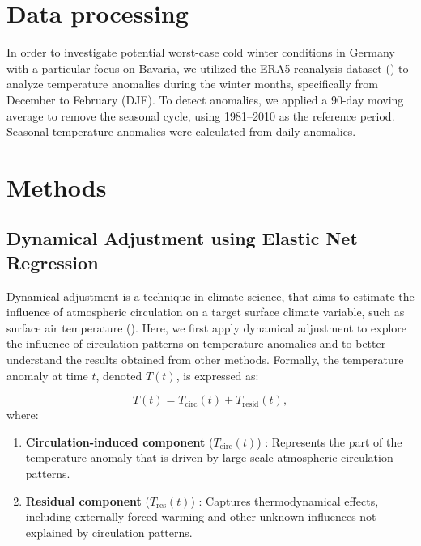 \documentclass[
]{krantz}
\begin{document}
\section{Data processing}\label{data-processing}

In order to investigate potential worst-case cold winter conditions in Germany with a particular focus on Bavaria, we utilized the ERA5 reanalysis dataset (\citet{hersbach2020}) to analyze temperature anomalies during the winter months, specifically from December to February (DJF). To detect anomalies, we applied a 90-day moving average to remove the seasonal cycle, using 1981--2010 as the reference period. Seasonal temperature anomalies were calculated from daily anomalies.

\section{Methods}\label{methods}

\subsection{Dynamical Adjustment using Elastic Net Regression}\label{dynamical-adjustment-using-elastic-net-regression}

Dynamical adjustment is a technique in climate science, that aims to estimate the influence of atmospheric circulation on a target surface climate variable, such as surface air temperature (\citep{wallace1995, smoliak2015, deser2016}). Here, we first apply dynamical adjustment to explore the influence of circulation patterns on temperature anomalies and to better understand the results obtained from other methods. Formally, the temperature anomaly at time \(t\), denoted \(T(t)\), is expressed as:

\[
T(t) = T_{\text{circ}}(t) + T_{\text{resid}}(t),
\]
where:

\begin{enumerate}
\def\labelenumi{\arabic{enumi}.}
\item
  \textbf{Circulation-induced component} (\(T_{\text{circ}}(t)\)) : Represents the part of the temperature anomaly that is driven by large-scale atmospheric circulation patterns.
\item
  \textbf{Residual component} (\(T_{\text{res}}(t)\)) : Captures thermodynamical effects, including externally forced warming and other unknown influences not explained by circulation patterns.
\end{enumerate}
\end{document}
